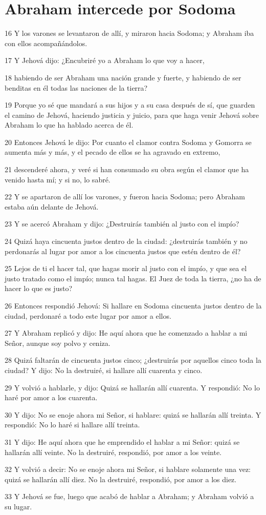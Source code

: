 \section*{Abraham intercede por Sodoma}

\par 16 Y los varones se levantaron de allí, y miraron hacia Sodoma; y Abraham iba con ellos acompañándolos.
\par 17 Y Jehová dijo: ¿Encubriré yo a Abraham lo que voy a hacer,
\par 18 habiendo de ser Abraham una nación grande y fuerte, y habiendo de ser benditas en él todas las naciones de la tierra?
\par 19 Porque yo sé que mandará a sus hijos y a su casa después de sí, que guarden el camino de Jehová, haciendo justicia y juicio, para que haga venir Jehová sobre Abraham lo que ha hablado acerca de él.
\par 20 Entonces Jehová le dijo: Por cuanto el clamor contra Sodoma y Gomorra se aumenta más y más, y el pecado de ellos se ha agravado en extremo,
\par 21 descenderé ahora, y veré si han consumado su obra según el clamor que ha venido hasta mí; y si no, lo sabré.
\par 22 Y se apartaron de allí los varones, y fueron hacia Sodoma; pero Abraham estaba aún delante de Jehová.
\par 23 Y se acercó Abraham y dijo: ¿Destruirás también al justo con el impío?
\par 24 Quizá haya cincuenta justos dentro de la ciudad: ¿destruirás también y no perdonarás al lugar por amor a los cincuenta justos que estén dentro de él?
\par 25 Lejos de ti el hacer tal, que hagas morir al justo con el impío, y que sea el justo tratado como el impío; nunca tal hagas. El Juez de toda la tierra, ¿no ha de hacer lo que es justo?
\par 26 Entonces respondió Jehová: Si hallare en Sodoma cincuenta justos dentro de la ciudad, perdonaré a todo este lugar por amor a ellos.
\par 27 Y Abraham replicó y dijo: He aquí ahora que he comenzado a hablar a mi Señor, aunque soy polvo y ceniza.
\par 28 Quizá faltarán de cincuenta justos cinco; ¿destruirás por aquellos cinco toda la ciudad? Y dijo: No la destruiré, si hallare allí cuarenta y cinco.
\par 29 Y volvió a hablarle, y dijo: Quizá se hallarán allí cuarenta. Y respondió: No lo haré por amor a los cuarenta.
\par 30 Y dijo: No se enoje ahora mi Señor, si hablare: quizá se hallarán allí treinta. Y respondió: No lo haré si hallare allí treinta.
\par 31 Y dijo: He aquí ahora que he emprendido el hablar a mi Señor: quizá se hallarán allí veinte. No la destruiré, respondió, por amor a los veinte.
\par 32 Y volvió a decir: No se enoje ahora mi Señor, si hablare solamente una vez: quizá se hallarán allí diez. No la destruiré, respondió, por amor a los diez.
\par 33 Y Jehová se fue, luego que acabó de hablar a Abraham; y Abraham volvió a su lugar.

